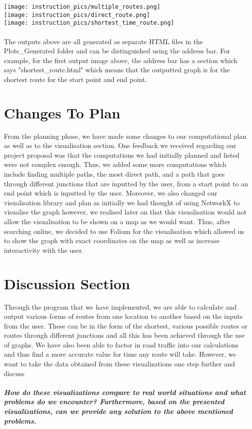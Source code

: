 \documentclass[fontsize=11pt]{IEEEtran}
\begin{document}
\texttt{[image: instruction\_pics/multiple\_routes.png]}
\\

\texttt{[image: instruction\_pics/direct\_route.png]}
\\

\texttt{[image: instruction\_pics/shortest\_time\_route.png]}
\\
\\

The outputs above are all generated as separate HTML files in the Plots\_Generated folder and can be distinguished using the address bar. For example, for the first output image above, the address bar has a section which says "shortest\_route.html" which means that the outputted graph is for the shortest route for the start point and end point.

\section{Changes To Plan}

From the planning phase, we have made some changes to our computational plan as well as to the visualisation section. One feedback we received regarding our project proposal was that the computations we had initially planned and listed were not complex enough. Thus, we added some more computations which include finding multiple paths, the most direct path, and a path that goes through different junctions that are inputted by the user, from a start point to an end point which is inputted by the user. Moreover, we also changed our visualisation library and plan as initially we had thought of using NetworkX to visualise the graph however, we realised later on that this visualisation would not allow the visualisation to be shown on a map as we would want. Thus, after searching online, we decided to use Folium for the visualisation which allowed us to show the graph with exact coordinates on the map as well as increase interactivity with the user.
\section{Discussion Section}

Through the program that we have implemented, we are able to calculate and output various forms of routes from one location to another based on the inputs from the user. These can be in the form of the shortest, various possible routes or routes through different junctions and all this has been achieved through the use of graphs. We have also been able to factor in road traffic into our calculations and thus find a more accurate value for time any route will take. However, we want to take the data obtained from these visualizations one step further and discuss \\ \\ \textbf{\textit{How do these visualizations compare to real world situations and what problems do we encounter? Furthermore, based on the presented visualizations, can we provide any solution to the above mentioned problems.}}\\
\end{document}
